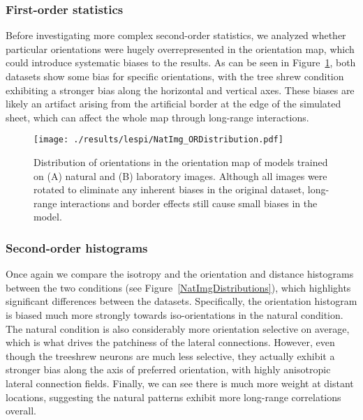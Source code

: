 \subsubsection*{First-order statistics}

Before investigating more complex second-order statistics, we analyzed
whether particular orientations were hugely overrepresented in the
orientation map, which could introduce systematic biases to the
results. As can be seen in Figure~\ref{NatImgORs}, both datasets show
some bias for specific orientations, with the tree shrew condition
exhibiting a stronger bias along the horizontal and vertical
axes. These biases are likely an artifact arising from the artificial
border at the edge of the simulated sheet, which can affect the whole
map through long-range interactions.

\begin{figure}
	\centering
    \texttt{[image: ./results/lespi/NatImg\_ORDistribution.pdf]}
	\caption[Distribution of orientations in the orientation map of
      models trained on natural and laboratory images.]{Distribution
      of orientations in the orientation map of models trained on (A)
      natural and (B) laboratory images. Although all images were
      rotated to eliminate any inherent biases in the original
      dataset, long-range interactions and border effects still cause
      small biases in the model.}
	\label{NatImgORs}
\end{figure}

\subsubsection*{Second-order histograms}

Once again we compare the isotropy and the orientation and distance
histograms between the two conditions (see
Figure~\ref{NatImgDistributions}), which highlights significant
differences between the datasets. Specifically, the orientation
histogram is biased much more strongly towards iso-orientations in the
natural condition. The natural condition is also considerably more
orientation selective on average, which is what drives the patchiness
of the lateral connections. However, even though the treeshrew neurons
are much less selective, they actually exhibit a stronger bias along
the axis of preferred orientation, with highly anisotropic lateral
connection fields. Finally, we can see there is much more weight at
distant locations, suggesting the natural patterns exhibit more
long-range correlations overall.

